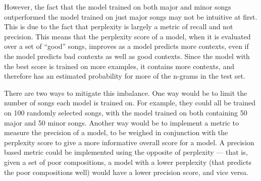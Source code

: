 \documentclass{sig-alternate}
\begin{document}
However, the fact that the model trained on both major and minor songs outperformed the model trained on just major songs may not be intuitive at first. This is due to the fact that perplexity is largely a metric of recall and not precision. This means that the perplexity score of a model, when it is evaluated over a set of ``good'' songs, improves as a model predicts more contexts, even if the model predicts bad contexts as well as good contexts. Since the model with the best score is trained on more examples, it contains more contexts, and therefore has an estimated probability for more of the n-grams in the test set.

There are two ways to mitigate this imbalance. One way would be to limit the number of songs each model is trained on. For example, they could all be trained on 100 randomly selected songs, with the model trained on both containing 50 major and 50 minor songs. Another way would be to implement a metric to measure the precision of a model, to be weighed in conjunction with the perplexity score to give a more informative overall score for a model. A precision based metric could be implemented using the opposite of perplexity --- that is, given a set of poor compositions, a model with a lower perplexity (that predicts the poor compositions well) would have a lower precision score, and vice versa.
\end{document}
